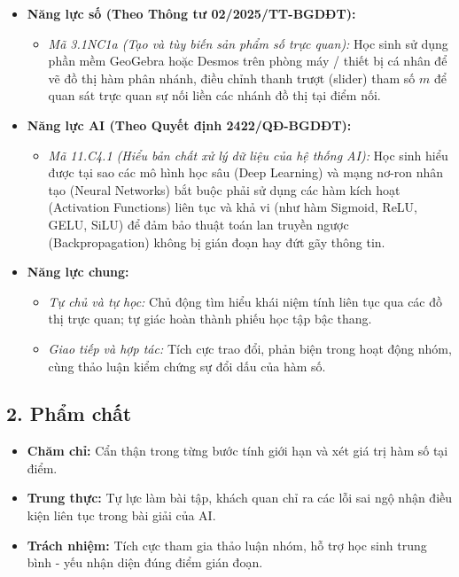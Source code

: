 \documentclass[12pt, a4paper]{article}
\begin{document}
\begin{itemize}[leftmargin=1.2cm]
    \item \textbf{Năng lực số (Theo Thông tư 02/2025/TT-BGDĐT):}
    \begin{itemize}[leftmargin=0.6cm]
        \item \textit{Mã 3.1NC1a (Tạo và tùy biến sản phẩm số trực quan):} Học sinh sử dụng phần mềm GeoGebra hoặc Desmos trên phòng máy / thiết bị cá nhân để vẽ đồ thị hàm phân nhánh, điều chỉnh thanh trượt (slider) tham số $m$ để quan sát trực quan sự nối liền các nhánh đồ thị tại điểm nối.
    \end{itemize}

    \item \textbf{Năng lực AI (Theo Quyết định 2422/QĐ-BGDĐT):}
    \begin{itemize}[leftmargin=0.6cm]
        \item \textit{Mã 11.C4.1 (Hiểu bản chất xử lý dữ liệu của hệ thống AI):} Học sinh hiểu được tại sao các mô hình học sâu (Deep Learning) và mạng nơ-ron nhân tạo (Neural Networks) bắt buộc phải sử dụng các hàm kích hoạt (Activation Functions) liên tục và khả vi (như hàm Sigmoid, ReLU, GELU, SiLU) để đảm bảo thuật toán lan truyền ngược (Backpropagation) không bị gián đoạn hay đứt gãy thông tin.
    \end{itemize}

    \item \textbf{Năng lực chung:}
    \begin{itemize}[leftmargin=0.6cm]
        \item \textit{Tự chủ và tự học:} Chủ động tìm hiểu khái niệm tính liên tục qua các đồ thị trực quan; tự giác hoàn thành phiếu học tập bậc thang.
        \item \textit{Giao tiếp và hợp tác:} Tích cực trao đổi, phản biện trong hoạt động nhóm, cùng thảo luận kiểm chứng sự đổi dấu của hàm số.
    \end{itemize}
\end{itemize}

\subsection*{2. Phẩm chất}

\begin{itemize}[leftmargin=1.2cm]
    \item \textbf{Chăm chỉ:} Cẩn thận trong từng bước tính giới hạn và xét giá trị hàm số tại điểm.
    \item \textbf{Trung thực:} Tự lực làm bài tập, khách quan chỉ ra các lỗi sai ngộ nhận điều kiện liên tục trong bài giải của AI.
    \item \textbf{Trách nhiệm:} Tích cực tham gia thảo luận nhóm, hỗ trợ học sinh trung bình - yếu nhận diện đúng điểm gián đoạn.
\end{itemize}
\end{document}
